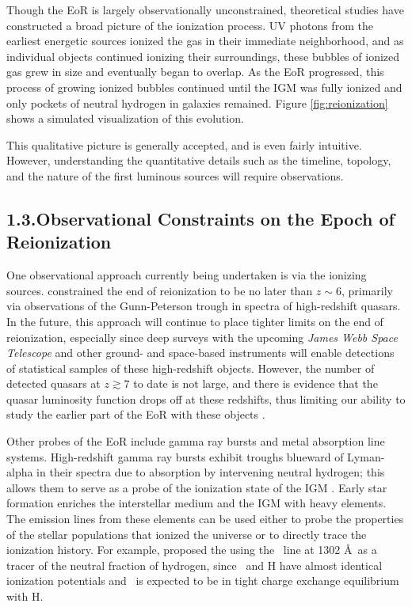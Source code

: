 \documentclass[12pt]{article}
\begin{document}
Though the EoR is largely observationally unconstrained, theoretical studies have constructed a broad picture of the ionization process. UV photons from the earliest energetic sources ionized the gas in their immediate neighborhood, and as individual objects continued ionizing their surroundings, these bubbles of ionized gas grew in size and eventually began to overlap. As the EoR progressed, this process of growing ionized bubbles continued until the IGM was fully ionized and only pockets of neutral hydrogen in galaxies remained. Figure \ref{fig:reionization} shows a simulated visualization of this evolution.

This qualitative picture is generally accepted, and is even fairly intuitive. However, understanding the quantitative details such as the timeline, topology, and the nature of the first luminous sources will require observations. \vspace{3mm}

\tocless\subsection{\hypertarget{subsec:constraints}{1.3.\hspace{0.75em}Observational Constraints on the Epoch of Reionization}}

One observational approach currently being undertaken is via the ionizing sources. \cite{fan2006} constrained the end of reionization to be no later than $z \sim 6$, primarily via observations of the Gunn-Peterson trough in spectra of high-redshift quasars. In the future, this approach will continue to place tighter limits on the end of reionization, especially since deep surveys with the upcoming \textit{James Webb Space Telescope} and other ground- and space-based instruments will enable detections of statistical samples of these high-redshift objects. However, the number of detected quasars at $z \gtrsim 7$ to date is not large, and there is evidence that the quasar luminosity function drops off at these redshifts, thus limiting our ability to study the earlier part of the EoR with these objects \citep{richards2006, hopkins2007}.

Other probes of the EoR include gamma ray bursts and metal absorption line systems. High-redshift gamma ray bursts exhibit troughs blueward of Lyman-alpha in their spectra due to absorption by intervening neutral hydrogen; this allows them to serve as a probe of the ionization state of the IGM \citep[e.g.,][]{gallerani2008}. Early star formation enriches the interstellar medium and the IGM with heavy elements. The emission lines from these elements can be used either to probe the properties of the stellar populations that ionized the universe or to directly trace the ionization history. For example, \cite{oh2002} proposed the using the \OI~line at 1302 \AA~as a tracer of the neutral fraction of hydrogen, since \OI~and H have almost identical ionization potentials and \OI~is expected to be in tight charge exchange equilibrium with H.
\end{document}
